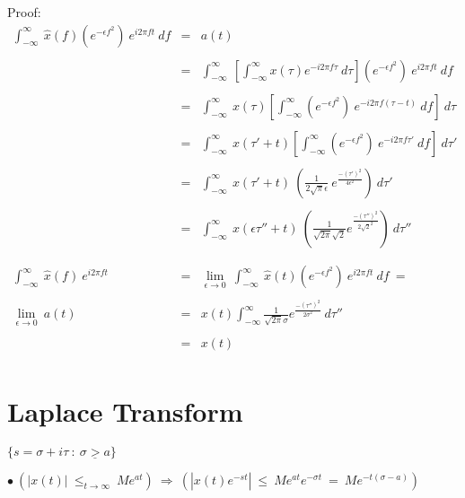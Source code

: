 \documentclass[12pt]{article}
\begin{document}
Proof:
\begin{eqnarray*}
	\int_{-\infty}^{\infty} \ \hat{x}(f) (e^{-\epsilon f^2}) \ e^{i 2\pi f t} \ df &=& a(t) \\ \\
	&=& \int_{-\infty}^{\infty} \ \left[ \int_{-\infty}^{\infty} x(\tau) e^{-i 2\pi f \tau} \ d\tau \right] (e^{-\epsilon f^2}) \ e^{i 2\pi f t} \ df \\ \\
	&=& \int_{-\infty}^{\infty} \ x(\tau) \left[ \int_{-\infty}^{\infty} (e^{-\epsilon f^2}) \ e^{- i 2\pi f (\tau-t)} \ df \right] \ d\tau \\ \\
	&=& \int_{-\infty}^{\infty} \ x(\tau'+t) \left[ \int_{-\infty}^{\infty} (e^{-\epsilon f^2}) \ e^{- i 2\pi f\tau'} \ df \right] \ d\tau' \\ \\
	&=& \int_{-\infty}^{\infty} \ x(\tau'+t) \ \left( \frac{1}{2\sqrt{\pi}\epsilon} \ e^{\frac{-(\tau')^2}{4\epsilon^2}} \right) \ d\tau' \\ \\
	&=& \int_{-\infty}^{\infty} \ x(\epsilon\tau''+t) \ \left( \frac{1}{\sqrt{2\pi}\sqrt{2}} e^{ \frac{-(\tau'')^2}{2\sqrt{2}^2} } \right) \ d\tau'' \\ \\ \\
	\int_{-\infty}^{\infty} \ \hat{x}(f) \ e^{i 2\pi f t} &=& \lim_{\epsilon\rightarrow 0} \ \int_{-\infty}^{\infty} \ \hat{x}(t) (e^{-\epsilon f^2}) \ e^{i 2\pi f t} \ df \ = \ \\ \\
	\lim_{\epsilon\rightarrow 0} \ a(t) &=& x(t) \int_{-\infty}^{\infty} \frac{1}{\sqrt{2\pi}\sigma} e^{ \frac{-(\tau'')^2}{2\sigma^2} } \ d\tau'' \\ \\
	&=& x(t) \\
\end{eqnarray*}

\section{Laplace Transform}
\(\{ s = \sigma + i\tau \ : \ \underline{ \sigma > a } \}\)

\vspace{5pt}
\(\displaystyle
	\bullet\ \left( \left| x(t) \right| \ \leq_{t\rightarrow\infty} \ Me^{at} \right) 
	\ \Rightarrow \ \left( \left| x(t)e^{-st} \right| \ \leq \ Me^{at} e^{-\sigma t} \ = \ Me^{-t(\sigma-a)} \right)
\)
\end{document}

